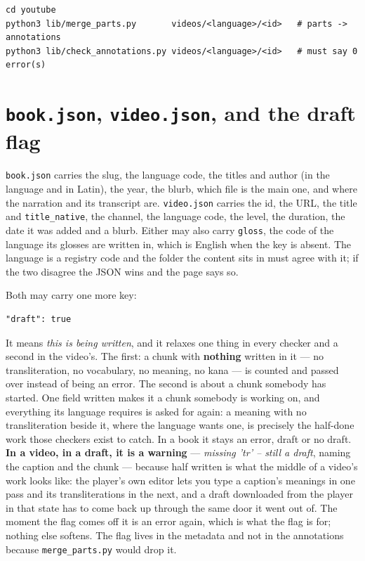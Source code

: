 \documentclass[11pt,oneside]{report}
\newcommand{\file}[1]{\texttt{#1}}
\begin{document}
\begin{lstlisting}
cd youtube
python3 lib/merge_parts.py       videos/<language>/<id>   # parts -> annotations
python3 lib/check_annotations.py videos/<language>/<id>   # must say 0 error(s)
\end{lstlisting}

\section{\file{book.json}, \file{video.json}, and the draft flag}
\label{sec:meta}

\file{book.json} carries the slug, the language code, the titles and author
(in the language and in Latin), the year, the blurb, which file is the main
one, and where the narration and its transcript are. \file{video.json} carries
the id, the URL, the title and \texttt{title\_native}, the channel, the
language code, the level, the duration, the date it was added and a blurb.
Either may also carry \texttt{gloss}, the code of the language its glosses
are written in, which is English when the key is absent.
The language is a registry code and the folder the content sits in must agree
with it; if the two disagree the JSON wins and the page says so.

Both may carry one more key:

\begin{lstlisting}
"draft": true
\end{lstlisting}

\noindent It means \emph{this is being written}, and it relaxes one thing in
every checker and a second in the video's. The first: a chunk with
\textbf{nothing} written in it --- no transliteration, no vocabulary, no
meaning, no kana --- is counted and passed over instead of being an error.
The second is about a chunk somebody has started. One field written makes it
a chunk somebody is working on, and everything its language requires is asked
for again: a meaning with no transliteration beside it, where the language
wants one, is precisely the half-done work those checkers exist to catch. In
a book it stays an error, draft or no draft. \textbf{In a video, in a draft,
it is a warning} ---
\emph{missing 'tr' -- still a draft}, naming the caption and the chunk ---
because half written is what the middle of a video's work looks like: the
player's own editor lets you type a caption's meanings in one pass and its
transliterations in the next, and a draft downloaded from the player in that
state has to come back up through the same door it went out of. The moment
the flag comes off it is an error again, which is what the flag is for;
nothing else softens. The flag lives in the metadata and not in the
annotations because \file{merge\_parts.py} would drop it.
\end{document}
